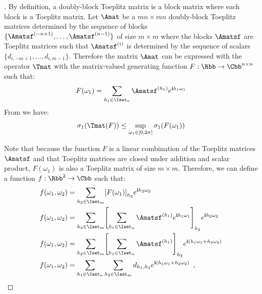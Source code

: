 %


\begin{proof}[]
  By definition, a doubly-block Toeplitz matrix is a block matrix where each block is a Toeplitz matrix.
  Let $\Amat$ be a $mn \times mn$ doubly-block Toeplitz matrices determined by the sequence of blocks $\{\Amatsf^{(-n+1)}, \dots, \Amatsf^{(n-1)} \}$ of size $m \times m$ where the blocks $\Amatsf$ are Toeplitz matrices such that $\Amatsf^{(i)}$ is determined by the sequence of scalars $\{d_{i, -m+1}, \dots, d_{i, m-1} \}$. 
  Therefore the matrix $\Amat$ can be expressed with the operator $\Tmat$ with the matrix-valued generating function $F: \Rbb \rightarrow \Cbb^{n \times n}$ such that:
  \begin{equation}
    F(\omega_1) = \sum_{h_1 \in \Iset_n} \Amatsf^{(h_1)} e^{\ci h_1\omega_1}
  \end{equation}
  From  we have:
  \begin{equation} \label{equation:th_bound_block_toeplitz}
    \sigma_1\left(\Tmat(F) \right) \leq \sup_{\omega_1 \in [0,2\pi] } \sigma_{1}\left( F(\omega_1) \right)
  \end{equation}

  \noindent
  Note that because the function $F$ is a linear combination of the Toeplitz matrices $\Amatsf$ and that Toeplitz matrices are closed under addition and scalar product, $F(\omega_1)$ is also a Toeplitz matrix of size $m \times m$. 
  Therefore, we can define a function $f: \Rbb^2 \rightarrow \Cbb$ such that: 
  \begin{align}
    f(\omega_1,\omega_2) &= \sum_{h_2 \in \Iset_m} \left[ F(\omega_1) \right]_{h_2} e^{\ci h_2 \omega_2} \\
    f(\omega_1,\omega_2) &= \sum_{h_2 \in \Iset_m} \left[ \sum_{h_1 \in \Iset_n} \Amatsf^{(h_1)} e^{\ci h_1\omega_1} \right]_{h_2} e^{\ci h_2 \omega_2} \\
    f(\omega_1,\omega_2) &= \sum_{h_2 \in \Iset_m} \left[ \sum_{h_1 \in \Iset_n} \Amatsf^{(h_1)} \right]_{h_2} e^{\ci \left( h_1\omega_1 + h_2 \omega_2 \right)} \\
    f(\omega_1,\omega_2) &= \sum_{h_1 \in \Iset_n} \sum_{h_2 \in \Iset_m} d_{h_1, h_2} e^{\ci \left( h_1\omega_1 + h_2 \omega_2\right)} \enspace,
  \end{align}




\end{proof}

